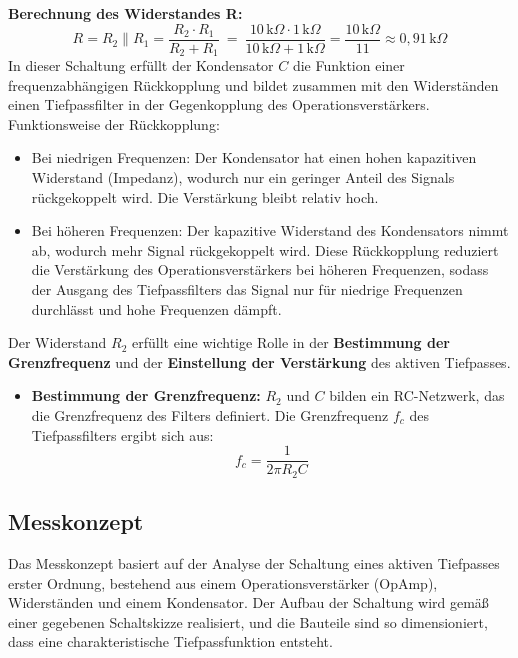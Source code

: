 \documentclass[a4paper,12pt]{article}
\begin{document}
\noindent \textbf{Berechnung des Widerstandes R:}
\[
R = R_2 \parallel R_1 = \frac{R_2 \cdot R_1}{R_2 + R_1}~=~\frac{10 \, \text{k}\Omega \cdot 1 \, \text{k}\Omega}{10 \, \text{k}\Omega + 1 \, \text{k}\Omega} = \frac{10 \, \text{k}\Omega}{11} \approx 0{,}91 \, \text{k}\Omega
\]
In dieser Schaltung erfüllt der Kondensator $C$ die Funktion einer frequenzabhängigen Rückkopplung und bildet zusammen mit den Widerständen einen Tiefpassfilter in der Gegenkopplung des Operationsverstärkers.\\
\noindent Funktionsweise der Rückkopplung:
\begin{itemize}
\item Bei niedrigen Frequenzen: Der Kondensator hat einen hohen kapazitiven Widerstand (Impedanz), wodurch nur ein geringer Anteil des Signals rückgekoppelt wird. Die Verstärkung bleibt relativ hoch.
\item Bei höheren Frequenzen: Der kapazitive Widerstand des Kondensators nimmt ab, wodurch mehr Signal rückgekoppelt wird. Diese Rückkopplung reduziert die Verstärkung des Operationsverstärkers bei höheren Frequenzen, sodass der Ausgang des Tiefpassfilters das Signal nur für niedrige Frequenzen durchlässt und hohe Frequenzen dämpft.
\end{itemize}
\noindent Der Widerstand $R_2$ erfüllt eine wichtige Rolle in der \textbf{Bestimmung der Grenzfrequenz} und der \textbf{Einstellung der Verstärkung} des aktiven Tiefpasses.

\begin{itemize}
    \item \textbf{Bestimmung der Grenzfrequenz:} $R_2$ und $C$ bilden ein RC-Netzwerk, das die Grenzfrequenz des Filters definiert. Die Grenzfrequenz $f_c$ des Tiefpassfilters ergibt sich aus:
    \[
    f_c = \frac{1}{2 \pi R_2 C}
    \]
\end{itemize}





\subsection{Messkonzept}
Das Messkonzept basiert auf der Analyse der Schaltung eines aktiven Tiefpasses erster Ordnung, bestehend aus einem Operationsverstärker (OpAmp), Widerständen und einem Kondensator. Der Aufbau der Schaltung wird gemäß einer gegebenen Schaltskizze realisiert, und die Bauteile sind so dimensioniert, dass eine charakteristische Tiefpassfunktion entsteht.\\
\end{document}
